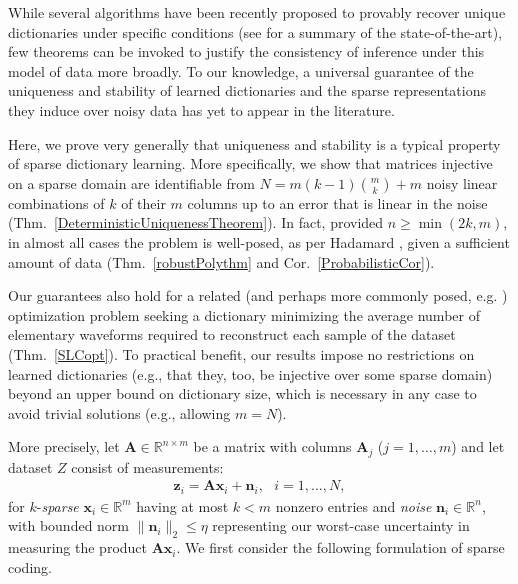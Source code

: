 \documentclass[journal, twocolumn]{IEEEtran}
\begin{document}
While several algorithms have been recently proposed to provably recover unique dictionaries under specific conditions (see \cite[Sec.~I-E]{Sun16} for a summary of the state-of-the-art), few theorems can be invoked to justify the consistency of inference under this model of data more broadly. To our knowledge, a universal guarantee of the uniqueness and stability of learned dictionaries and the sparse representations they induce over noisy data has yet to appear in the literature.

Here, we prove very generally that uniqueness and stability is a typical property of sparse dictionary learning. More specifically, we show that matrices injective on a sparse domain are identifiable from \mbox{$N = m(k-1){m \choose k} + m$} noisy linear combinations of $k$ of their $m$ columns up to an error that is linear in the noise (Thm.~\ref{DeterministicUniquenessTheorem}). In fact, provided $n \geq \min(2k,m)$, in almost all cases the problem is well-posed, as per Hadamard \cite{Hadamard1902}, given a sufficient amount of data (Thm.~\ref{robustPolythm} and Cor.~\ref{ProbabilisticCor}). 

Our guarantees also hold for a related (and perhaps more commonly posed, e.g. \cite{rehnsommer2007}) optimization problem seeking a dictionary minimizing the average number of elementary waveforms required to reconstruct each sample of the dataset (Thm.~\ref{SLCopt}). To practical benefit, our results impose no restrictions on learned dictionaries (e.g., that they, too, be injective over some sparse domain) beyond an upper bound on dictionary size, which is necessary in any case to avoid trivial solutions (e.g., allowing $m = N$). %

More precisely, let $\mathbf{A} \in \mathbb R^{n \times m}$ be a matrix with columns $\mathbf{A}_j$ ($j = 1,\ldots,m$) and let dataset $Z$ consist of measurements:
\begin{align}\label{LinearModel}
\mathbf{z}_i = \mathbf{A}\mathbf{x}_i + \mathbf{n}_i,\ \ \  \text{$i=1,\ldots,N$},
\end{align}
for $k$-\emph{sparse} $\mathbf{x}_i \in \mathbb{R}^m$ having at most $k<m$ nonzero entries and \emph{noise} $\mathbf{n}_i \in \mathbb{R}^n$, with bounded norm $\| \mathbf{n}_i \|_2 \leq  \eta$ representing our worst-case uncertainty in measuring the product $\mathbf{A}\mathbf{x}_i$. We first consider the following formulation of sparse coding.
\end{document}
